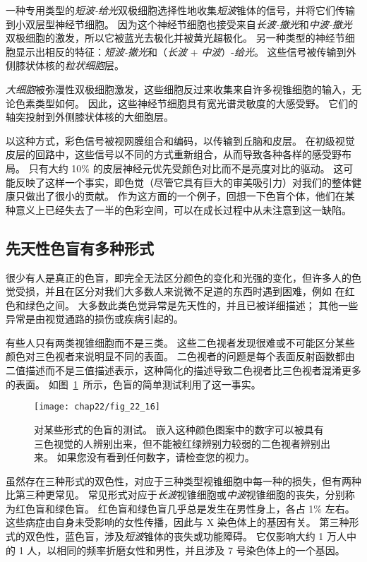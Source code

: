 一种专用类型的\textit{短波-给光}双极细胞选择性地收集\textit{短波}锥体的信号，并将它们传输到小双层型神经节细胞。
因为这个神经节细胞也接受来自\textit{长波-撤光}和\textit{中波-撤光}双极细胞的激发，所以它被蓝光去极化并被黄光超极化。
另一种类型的神经节细胞显示出相反的特征：\textit{短波-撤光}和（\textit{长波} + \textit{中波}）-\textit{给光}。
这些信号被传输到外侧膝状体核的\textit{粒状细胞}层。


\textit{大细胞}被弥漫性双极细胞激发，这些细胞反过来收集来自许多视锥细胞的输入，无论色素类型如何。
因此，这些神经节细胞具有宽光谱灵敏度的大感受野。
它们的轴突投射到外侧膝状体核的大细胞层。


以这种方式，彩色信号被视网膜组合和编码，以传输到丘脑和皮层。
在初级视觉皮层的回路中，这些信号以不同的方式重新组合，从而导致各种各样的感受野布局。
只有大约 10\% 的皮层神经元优先受颜色对比而不是亮度对比的驱动。
这可能反映了这样一个事实，即色觉（尽管它具有巨大的审美吸引力）对我们的整体健康只做出了很小的贡献。
作为这方面的一个例子，回想一下色盲个体，他们在某种意义上已经失去了一半的色彩空间，可以在成长过程中从未注意到这一缺陷。



\subsection{先天性色盲有多种形式}

很少有人是真正的色盲，即完全无法区分颜色的变化和光强的变化，但许多人的色觉受损，并且在区分对我们大多数人来说微不足道的东西时遇到困难，例如 在红色和绿色之间。
大多数此类色觉异常是先天性的，并且已被详细描述；
其他一些异常是由视觉通路的损伤或疾病引起的。


有些人只有两类视锥细胞而不是三类。
这些二色视者发现很难或不可能区分某些颜色对三色视者来说明显不同的表面。
二色视者的问题是每个表面反射函数都由二值描述而不是三值描述表示，这种简化的描述导致二色视者比三色视者混淆更多的表面。
如图~\ref{fig:22_16}~所示，色盲的简单测试利用了这一事实。


\begin{figure}[htbp]
	\centering
	\texttt{[image: chap22/fig\_22\_16]}
	\caption{对某些形式的色盲的测试。 
		嵌入这种颜色图案中的数字可以被具有三色视觉的人辨别出来，但不能被红绿辨别力较弱的二色视者辨别出来。 
		如果您没有看到任何数字，请检查您的视力。}
	\label{fig:22_16}
\end{figure}


虽然存在三种形式的双色性，对应于三种类型视锥细胞中每一种的损失，但有两种比第三种更常见。
常见形式对应于\textit{长波}视锥细胞或\textit{中波}视锥细胞的丧失，分别称为红色盲和绿色盲。
红色盲和绿色盲几乎总是发生在男性身上，各占 1\% 左右。
这些病症由自身未受影响的女性传播，因此与 X 染色体上的基因有关。
第三种形式的双色性，蓝色盲，涉及\textit{短波}锥体的丧失或功能障碍。
它仅影响大约 1 万人中的 1 人，以相同的频率折磨女性和男性，并且涉及 7 号染色体上的一个基因。


